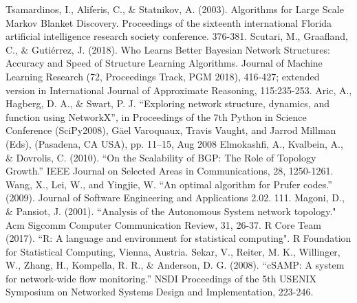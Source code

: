 \documentclass[conference]{IEEEtran}
\begin{document}
\begin{thebibliography}{00}
 Tsamardinos, I., Aliferis, C., \& Statnikov, A. (2003). Algorithms for Large Scale Markov Blanket Discovery. Proceedings of the sixteenth international Florida artificial intelligence research society conference. 376-381.
 Scutari, M., Graafland, C., \& Gutiérrez, J. (2018). Who Learns Better Bayesian Network Structures: Accuracy and Speed of Structure Learning Algorithms. Journal of Machine Learning Research (72, Proceedings Track, PGM 2018), 416-427; extended version in International Journal of Approximate Reasoning, 115:235-253.
 Aric, A., Hagberg, D. A., \& Swart, P. J. ``Exploring network structure, dynamics, and function using NetworkX”, in Proceedings of the 7th Python in Science Conference (SciPy2008), Gäel Varoquaux, Travis Vaught, and Jarrod Millman (Eds), (Pasadena, CA USA), pp. 11–15, Aug 2008
 Elmokashfi, A., Kvalbein, A., \& Dovrolis, C. (2010). ``On the Scalability of BGP: The Role of Topology Growth.” IEEE Journal on Selected Areas in Communications, 28, 1250-1261.
 Wang, X., Lei, W., and Yingjie, W. ``An optimal algorithm for Prufer codes.” (2009). Journal of Software Engineering and Applications 2.02. 111.
 Magoni, D., \& Pansiot, J. (2001). ``Analysis of the Autonomous System network topology." Acm Sigcomm Computer Communication Review, 31, 26-37.
 R Core Team (2017). ``R: A language and environment for statistical computing". R Foundation for Statistical Computing, Vienna, Austria.
 Sekar, V., Reiter, M. K., Willinger, W., Zhang, H., Kompella, R. R., \& Anderson, D. G. (2008). ``cSAMP: A system for network-wide flow monitoring.” NSDI Proceedings of the 5th USENIX Symposium on Networked Systems Design and Implementation, 223-246.

\end{thebibliography}
\end{document}
